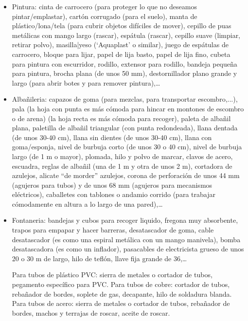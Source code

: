 \documentclass[spanish,10pt,a4paper,final,oneside]{article}
\begin{document}
\begin{itemize}

\item Pintura: cinta de carrocero (para proteger lo que no deseamos pintar/emplastar), cartón corrugado (para el suelo), manta de plástico/lona/tela (para cubrir objetos difíciles de mover), cepillo de puas metálicas con mango largo (rascar), espátula (rascar), cepillo suave (limpiar, retirar polvo), masilla|yeso (`Aquaplast' o similar), juego de espátulas de carrocero, bloque para lijar, papel de lija basto, papel de lija fino, cubeta para pintura con escurridor, rodillo, extensor para rodillo, bandeja pequeña para pintura, brocha plana (de unos 50 mm), destornillador plano grande y largo (para abrir botes y para remover pintura),\ldots 

\item Albañileria: capazos de goma (para mezclas, para transportar escombro,...), pala (la hoja con punta es más cómoda para hincar en montones de escombro o de arena) (la hoja recta es más cómoda para recoger), paleta de albañil plana, paletilla de albañil triangular (con punta redondeada), llana dentada (de unos 30-40 cm), llana sin dientes (de unos 30-40 cm), llana con goma/esponja, nivel de burbuja corto (de unos 30 o 40 cm), nivel de burbuja largo (de 1 m o mayor), plomada, hilo y polvo de marcar, clavos de acero, escuadra, reglas de albañil (una de 1 m y otra de unos 2 m), cortadora de azulejos, alicate ``de morder'' azulejos, corona de perforación de unos 44 mm (agujeros para tubos) y de unos 68 mm (agujeros para mecanismos eléctricos), caballetes con tablones o andamio corrido (para trabajar cómodamente en altura a lo largo de una pared),\ldots

\item Fontaneria: bandejas y cubos para recoger liquido, fregona muy absorbente, trapos para empapar y hacer barreras, desatascador de goma, cable desatascador (es como una espiral metálica con un mango manivela), bomba desatascadora (es como un inflador), pasacables de electricista grueso de unos 20 o 30 m de largo, hilo de teflón, llave fija grande de 36,\ldots

Para tubos de plástico PVC: sierra de metales o cortador de tubos, pegamento específico para PVC. Para tubos de cobre: cortador de tubos, rebañador de bordes, soplete de gas, decapante, hilo de soldadura blanda. Para tubos de acero: sierra de metales o cortador de tubos, rebañador de bordes, machos y terrajas de roscar, aceite de roscar.


\end{itemize}
\end{document}
